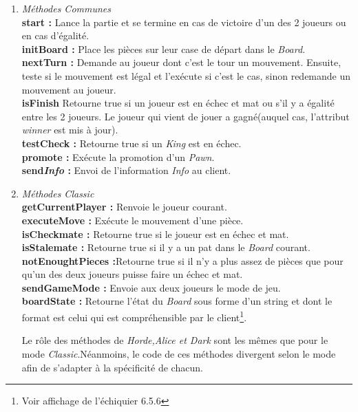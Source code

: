 \documentclass[10pt, a4paper]{article}
\begin{document}
\begin{enumerate}
\item \textit{Méthodes Communes} \\
\textbf{start :} Lance la partie et se termine en cas de victoire d'un des 2 joueurs ou en cas d'égalité. \\
\textbf{initBoard :} Place les pièces sur leur case de départ dans le \textit{Board}. \\
\textbf{nextTurn :} Demande au joueur dont c'est le tour un mouvement. Ensuite, teste si le mouvement est légal et l'exécute si c'est le cas, sinon redemande un mouvement au joueur. \\
\textbf{isFinish} Retourne true si un joueur est en échec et mat ou s'il y a égalité entre les 2 joueurs. Le joueur qui vient de jouer a gagné(auquel cas, l'attribut \textit{winner} est mis à jour). \\
\textbf{testCheck :} Retourne true si un \textit{King} est en échec. \\
\textbf{promote :} Exécute la promotion d'un \textit{Pawn}.\\
\textbf{send\textsl{Info} :} Envoi de l'information \textsl{Info} au client.\\

\item \textit{Méthodes Classic } \\
\textbf{getCurrentPlayer :} Renvoie le joueur courant.\\
\textbf{executeMove :} Exécute le mouvement d'une pièce.\\
\textbf{isCheckmate :} Retourne true si le joueur est en échec et mat.\\
\textbf{isStalemate :} Retourne true si il y a un pat dans le \textit{Board} courant.\\
\textbf{notEnoughtPieces :}Retourne true si il n'y a plus assez de pièces que pour qu'un des deux joueurs puisse faire un échec et mat.\\
\textbf{sendGameMode :} Envoie aux deux joueurs le mode de jeu.\\
\textbf{boardState :} Retourne l'état du \textit{Board} sous forme d'un string et dont le format est celui qui est compréhensible par le client\footnote{Voir affichage de l'échiquier 6.5.6}.

Le rôle des méthodes de \textit{Horde,Alice et Dark} sont les mêmes que pour le mode \textit{Classic}.Néanmoins, le code de ces méthodes divergent selon le mode afin de s'adapter à la spécificité de chacun.


\end{enumerate}
\end{document}
